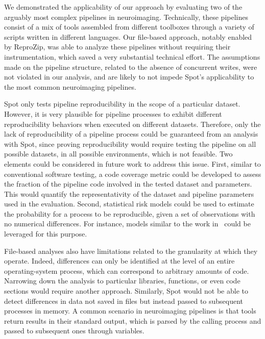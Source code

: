 \documentclass[a4paper,num-refs]{oup-contemporary}
\newcommand{\revised}[1]{\color{blue}#1\color{black}\xspace}
\newcommand{\reprozip}[0]{ReproZip\xspace}
\newcommand{\toolname}[0]{Spot\xspace}
\begin{document}
We demonstrated the applicability of our approach by evaluating two of the
arguably most complex pipelines in neuroimaging. Technically, these
pipelines consist of a mix of tools assembled from different toolboxes
through a variety of scripts written in different languages. Our file-based
approach, notably enabled by \reprozip, was able to analyze these pipelines
without requiring their instrumentation, which saved a very substantial
technical effort. The assumptions made on the pipeline structure, related
to the absence of concurrent writes, were not violated in our analysis, and
are likely to not impede \toolname's applicability to the most common
neuroimaging pipelines.

\revised{
\toolname only tests pipeline reproducibility in the scope of a particular dataset. However, it is very plausible 
for pipeline processes to exhibit different reproducibility behaviors when executed on different datasets. 
Therefore, only the lack of reproducibility of a pipeline process could be guaranteed from an analysis with \toolname, 
since proving reproducibility would require testing the pipeline on all possible datasets, in all possible environments, 
which is not feasible. Two elements could be considered in future work to address this issue. 
First, similar to conventional software testing, a code coverage metric could be developed to assess 
the fraction of the pipeline code involved in the tested dataset and parameters. This would quantify 
the representativity of the dataset and pipeline parameters used in the evaluation. Second, statistical 
risk models could be used to estimate the probability for a process to be reproducible, given a set of 
observations with no numerical differences. For instance, models similar to the work in~\cite{beauzamy2004methodes} 
could be leveraged for this purpose.}

File-based analyses also have limitations related to the
granularity at which they operate. Indeed, differences can only be
identified at the level of an entire operating-system process, which can
correspond to arbitrary amounts of code. Narrowing down the analysis to
particular libraries, functions, or even code sections would require
another approach. Similarly, \toolname would not be able to detect
differences in data not saved in files but instead passed to subsequent processes
in memory. A common scenario in neuroimaging pipelines is that tools return
results in their standard output, which is parsed by the calling process
and passed to subsequent ones through variables.
\end{document}

